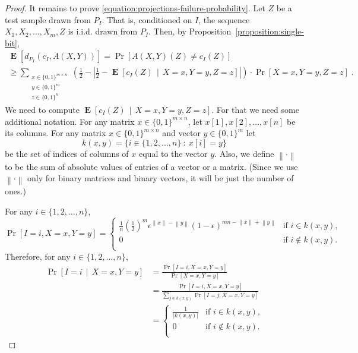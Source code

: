 \documentclass[11pt]{article}
\newcommand{\norm}[1]{\left\| #1 \right\|}
\DeclareMathOperator{\Exp}{\mathbf{E}}
\begin{document}
\begin{proof}
It remains to prove \eqref{equation:projections-failure-probability}. Let $Z$ be
a test sample drawn from $P_I$. That is, conditioned on $I$, the sequence $X_1,
X_2, \dots, X_m, Z$ is i.i.d. drawn from $P_I$. Then, by
Proposition~\ref{proposition:single-bit},
\begin{multline}
\label{equation:projections-expected-error-lower-bound}
\Exp \left[d_{P_I}(c_I, A(X,Y))\right]
= \Pr\left[ A(X,Y)(Z) \neq c_I(Z) \right] \\
\ge
\sum_{\substack{x \in \{0,1\}^{m \times n} \\ y \in \{0,1\}^m \\ z \in \{0,1\}^n}} \left( \frac{1}{2} - \left| \frac{1}{2} - \Exp\left[ c_I(Z) \, \middle| \, X = x, Y = y, Z = z \right] \right| \right) \cdot \Pr \left[X = x, Y = y, Z = z \right]  \; .
\end{multline}
We need to compute $\Exp\left[ c_I(Z) \, \middle| \, X = x, Y = y, Z = z \right]$.
For that we need some additional notation.
For any matrix $x \in \{0,1\}^{m \times n}$, let $x[1], x[2], \dots, x[n]$ be its columns.
For any matrix $x \in \{0,1\}^{m \times n}$ and vector $y \in \{0,1\}^m$ let
$$
k(x,y) = \{ i \in \{1,2,\dots,n\} ~:~ x[i] = y \}
$$
be the set of indices of columns of $x$ equal to the vector $y$. Also, we define
$\norm{\cdot}$ to be the sum of absolute values of entries of a vector or a
matrix. (Since we use $\norm{\cdot}$ only for binary matrices and binary
vectors, it will be just the number of ones.)

For any $i \in \{1,2,\dots,n\}$,
$$
\Pr \left[I = i, X = x, Y = y \right] 
=
\begin{cases}
\frac{1}{n} \left( \frac{1}{2} \right)^m \epsilon^{\norm{x} - \norm{y}} (1 - \epsilon)^{mn - \norm{x} + \norm{y}} & \text{if $i \in k(x,y)$,} \\
0 & \text{if $i \not \in k(x,y)$.} \\
\end{cases}
$$
Therefore, for any $i \in \{1,2,\dots,n\}$,
\begin{align*}
\Pr \left[I = i \, \middle| \, X = x, Y = y \right]
& = \frac{\Pr \left[I = i, X = x, Y = y \right]}{\Pr \left[ X = x, Y = y \right]} \\
& = \frac{\Pr \left[I = i, X = x, Y = y \right]}{\sum_{j \in k(x,y)} \Pr \left[ I = j, X = x, Y = y \right]} \\
&  =
\begin{cases}
\frac{1}{|k(x,y)|} & \text{if $i \in k(x,y)$,} \\
0 & \text{if $i \not \in k(x,y)$.} \\
\end{cases}
\end{align*}


\end{proof}
\end{document}
